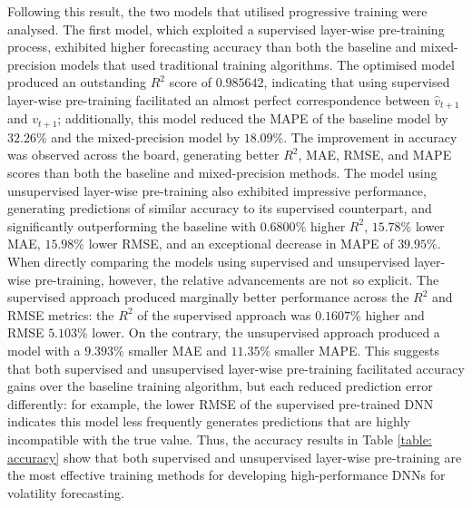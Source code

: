 \documentclass[a4paper, 11pt]{report}
\begin{document}
    Following this result, the two models that utilised progressive training were analysed. The first model, which exploited a supervised layer-wise pre-training process, exhibited higher forecasting accuracy than both the baseline and mixed-precision models that used traditional training algorithms. The optimised model produced an outstanding $R^2$ score of $0.985642$, indicating that using supervised layer-wise pre-training facilitated an almost perfect correspondence between $\hat{v}_{t+1}$ and $v_{t+1}$; additionally, this model reduced the MAPE of the baseline model by $32.26\%$ and the mixed-precision model by $18.09\%$. The improvement in accuracy was observed across the board, generating better $R^2$, MAE, RMSE, and MAPE scores than both the baseline and mixed-precision methods. The model using unsupervised layer-wise pre-training also exhibited impressive performance, generating predictions of similar accuracy to its supervised counterpart, and significantly outperforming the baseline with $0.6800\%$ higher $R^2$, $15.78\%$ lower MAE, $15.98\%$ lower RMSE, and an exceptional decrease in MAPE of $39.95\%$. When directly comparing the models using supervised and unsupervised layer-wise pre-training, however, the relative advancements are not so explicit. The supervised approach produced marginally better performance across the $R^2$ and RMSE metrics: the $R^2$ of the supervised approach was $0.1607\%$ higher and RMSE $5.103\%$ lower. On the contrary, the unsupervised approach produced a model with a $9.393\%$ smaller MAE and $11.35\%$ smaller MAPE. This suggests that both supervised and unsupervised layer-wise pre-training facilitated accuracy gains over the baseline training algorithm, but each reduced prediction error differently: for example, the lower RMSE of the supervised pre-trained DNN indicates this model less frequently generates predictions that are highly incompatible with the true value. Thus, the accuracy results in Table \ref{table: accuracy} show that both supervised and unsupervised layer-wise pre-training are the most effective training methods for developing high-performance DNNs for volatility forecasting. 
\end{document}
